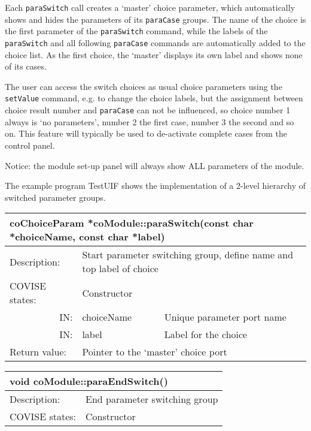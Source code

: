 Each {\tt paraSwitch} call creates a `master' choice parameter, which 
automatically shows and hides the parameters of its {\tt paraCase} groups. The name of the 
choice is the first parameter of the {\tt paraSwitch} command, while the labels of 
the {\tt paraSwitch} and all following {\tt paraCase} commands are automatically added to 
the choice list. As the first choice, the `master' displays its own label and shows none 
of its cases.

The user can access the switch choices as usual choice parameters using the {\tt setValue}
command, e.g. to change the choice labels, but the assignment between choice result number
and {\tt paraCase} can not be influenced, so choice number 1 always is `no parameters', 
number 2 the first case, number 3 the second and so on. This feature will typically be used 
to de-activate complete cases from the control panel.

Notice: the module set-up panel will always show ALL parameters of the module.

The example program TestUIF shows the implementation of a 2-level hierarchy of switched 
parameter groups.


\begin{longtable}{|p{4cm}|p{2.5cm}|p{7cm}|}
\hline
\multicolumn{3}{|p{13.5cm}|}{\bf coChoiceParam *coModule::paraSwitch(const char *choiceName,
                       const char *label)} \\
\hline
{Description:}   
              & \multicolumn{2}{|p{9.5cm}|}{Start parameter switching group,\newline
			           define name and top label of choice} \\                     
\hline
{COVISE states:} & \multicolumn{2}{|p{9.5cm}|}{Constructor} \\
\hline
\multicolumn{1}{|r|}{IN:} & {choiceName} 
                             & {Unique parameter port name}\\
\hline
\multicolumn{1}{|r|}{IN:} & {label} 
                            & {Label for the choice}\\
\hline
{Return value:}  
                        & \multicolumn{2}{|p{9.5cm}|}{Pointer to the `master' choice port} \endhead
\hline
\end{longtable}


\begin{longtable}{|p{4cm}|p{10cm}|}
\hline
\multicolumn{2}{|p{13.5cm}|}{\bf void coModule::paraEndSwitch()} \\
\hline
{Description:}   
                        & {End parameter switching group} \\
\hline
{COVISE states:} & {Constructor} \endhead
\hline
\end{longtable}


